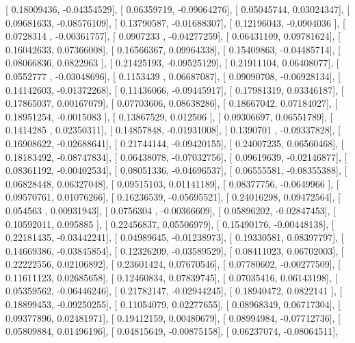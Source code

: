 \documentclass{article}
\begin{document}
       [ 0.18009436, -0.04354529],
       [ 0.06359719, -0.09064276],
       [ 0.05045744,  0.03024347],
       [ 0.09681633, -0.08576109],
       [ 0.13790587, -0.01688307],
       [ 0.12196043, -0.0904036 ],
       [ 0.0728314 , -0.00361757],
       [ 0.0907233 , -0.04277259],
       [ 0.06431109,  0.09781624],
       [ 0.16042633,  0.07366008],
       [ 0.16566367,  0.09964338],
       [ 0.15409863, -0.04485714],
       [ 0.08066836,  0.0822963 ],
       [ 0.21425193, -0.09525129],
       [ 0.21911104,  0.06408077],
       [ 0.0552777 , -0.03048696],
       [ 0.1153439 ,  0.06687087],
       [ 0.09090708, -0.06928134],
       [ 0.14142603, -0.01372268],
       [ 0.11436066, -0.09445917],
       [ 0.17981319,  0.03346187],
       [ 0.17865037,  0.00167079],
       [ 0.07703606,  0.08638286],
       [ 0.18667042,  0.07184027],
       [ 0.18951254, -0.0015083 ],
       [ 0.13867529,  0.012506  ],
       [ 0.09306697,  0.06551789],
       [ 0.1414285 ,  0.02350311],
       [ 0.14857848, -0.01931008],
       [ 0.1390701 , -0.09337828],
       [ 0.16908622, -0.02688641],
       [ 0.21744144, -0.09420155],
       [ 0.24007235,  0.06560468],
       [ 0.18183492, -0.08747834],
       [ 0.06438078, -0.07032756],
       [ 0.09619639, -0.02146877],
       [ 0.08361192, -0.00402534],
       [ 0.08051336, -0.04696537],
       [ 0.06555581, -0.08355388],
       [ 0.06828448,  0.06327048],
       [ 0.09515103,  0.01141189],
       [ 0.08377756, -0.0649966 ],
       [ 0.09570761,  0.01076266],
       [ 0.16236539, -0.05695521],
       [ 0.24016298,  0.09472564],
       [ 0.054563  ,  0.00931943],
       [ 0.0756304 , -0.00366609],
       [ 0.05896202, -0.02847453],
       [ 0.10592011,  0.095885  ],
       [ 0.22456837,  0.05506979],
       [ 0.15490176, -0.00448138],
       [ 0.22181435, -0.03442241],
       [ 0.04989645, -0.01238973],
       [ 0.19330581,  0.08397797],
       [ 0.14669386, -0.03845854],
       [ 0.12326209, -0.03589529],
       [ 0.08411023,  0.06702003],
       [ 0.22222556,  0.02106892],
       [ 0.23601424,  0.07670546],
       [ 0.07780602, -0.00277509],
       [ 0.11611123,  0.02685658],
       [ 0.12460834,  0.07839745],
       [ 0.07035416,  0.06143198],
       [ 0.05359562, -0.06446246],
       [ 0.21782147, -0.02944245],
       [ 0.18940472,  0.0822141 ],
       [ 0.18899453, -0.09250255],
       [ 0.11054079,  0.02277655],
       [ 0.08968349,  0.06717304],
       [ 0.09377896,  0.02481971],
       [ 0.19412159,  0.00480679],
       [ 0.08994984, -0.07712736],
       [ 0.05809884,  0.01496196],
       [ 0.04815649, -0.00875158],
       [ 0.06237074, -0.08064511],
\end{document}
